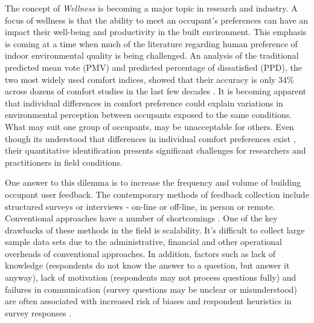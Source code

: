 

The concept of \emph{Wellness} is becoming a major topic in research and industry. A focus of wellness is that the ability to meet an occupant's preferences can have an impact their well-being and productivity in the built environment. This emphasis is coming at a time when much of the literature regarding human preference of indoor environmental quality is being challenged. An analysis of the traditional predicted mean vote (PMV) and predicted percentage of dissatisfied (PPD), the two most widely used comfort indices, showed that their accuracy is only 34\% across dozens of comfort studies in the last few decades \cite{cheung2019analysis, livcina2018development}. It is becoming apparent that individual differences in comfort preference could explain variations in environmental perception between occupants exposed to the same conditions. What may suit one group of occupants, may be unacceptable for others. Even though its understood that differences in individual comfort preferences exist \cite{WANG2018181}, their quantitative identification presents significant challenges for researchers and practitioners in field conditions. 

One answer to this dilemma is to increase the frequency and volume of building occupant user feedback. The contemporary methods of feedback collection include structured surveys or interviews - on-line or off-line, in person or remote. Conventional approaches have a number of shortcomings \cite{oecd}. One of the key drawbacks of these methods in the field is scalability. It's difficult to collect large sample data sets due to the administrative, financial and other operational overheads of conventional approaches. In addition, factors such as lack of knowledge (respondents do not know the answer to a question, but answer it anyway), lack of motivation (respondents may not process questions fully) and failures in communication (survey questions may be unclear or misunderstood) are often associated with increased risk of biases and respondent heuristics in survey responses \cite{bradburn2004asking}. 

